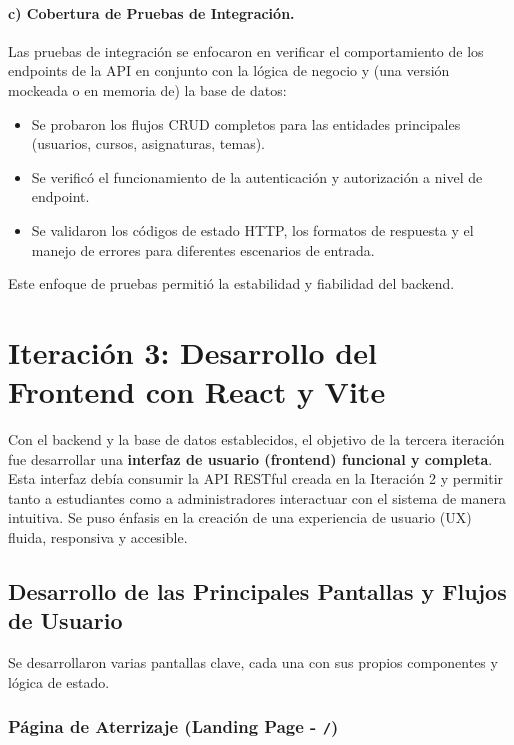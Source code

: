 \paragraph{c) Cobertura de Pruebas de Integración.}
Las pruebas de integración se enfocaron en verificar el comportamiento de los endpoints de la API en conjunto con la lógica de negocio y (una versión mockeada o en memoria de) la base de datos:
\begin{itemize}
    \item Se probaron los flujos CRUD completos para las entidades principales (usuarios, cursos, asignaturas, temas).
    \item Se verificó el funcionamiento de la autenticación y autorización a nivel de endpoint.
    \item Se validaron los códigos de estado HTTP, los formatos de respuesta y el manejo de errores para diferentes escenarios de entrada.
\end{itemize}

Este enfoque de pruebas permitió la estabilidad y fiabilidad del backend.

\section{Iteración 3: Desarrollo del Frontend con React y Vite}
\label{sec:desarrollo_iter3_frontend}

Con el backend y la base de datos establecidos, el objetivo de la tercera iteración fue desarrollar una \textbf{interfaz de usuario (frontend) funcional y completa}. Esta interfaz debía consumir la API RESTful creada en la Iteración 2 y permitir tanto a estudiantes como a administradores interactuar con el sistema de manera intuitiva. Se puso énfasis en la creación de una experiencia de usuario (UX) fluida, responsiva y accesible.

\subsection{Desarrollo de las Principales Pantallas y Flujos de Usuario}
\label{ssec:desarrollo_iter3_pantallas}

Se desarrollaron varias pantallas clave, cada una con sus propios componentes y lógica de estado.

\subsubsection{Página de Aterrizaje (Landing Page - \texttt{/})}
\label{sssec:desarrollo_landing_page}

